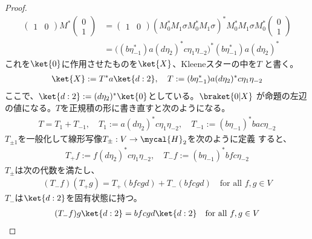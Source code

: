 {\begin{proof}
\begin{equation*}
\begin{split}
\begin{pmatrix}
				1 & 0
			\end{pmatrix}M^*\begin{pmatrix}
				0 \\ 1
			\end{pmatrix} &= \begin{pmatrix}
				1 & 0
			\end{pmatrix}(M_0^*M_1\sigma M_0^*M_1\sigma)^*M_0^*M_1\sigma M_0^*
			\begin{pmatrix}
				0 \\ 1
			\end{pmatrix} \\
			&= \bigl((b\eta_{-1}^*)a(d\eta_2)^*c\eta_1\eta_{-2}\bigr)^*
			(b\eta_{-1}^*)a(d\eta_2)^*
		\end{split}\end{equation*}
		これを$\ket{0}$に作用させたものを$\ket{X}$、Kleeneスターの中を$T$
		と書く。
		\begin{equation*}\begin{split}
			\ket{X} := T^*a\ket{d:2},\quad
			T := (b\eta_{-1}^*)a(d\eta_2)^*c\eta_1\eta_{-2}
		\end{split}\end{equation*}
		ここで、$\ket{d:2}:=(d\eta_2)^*\ket{0}$としている。$\braket{0|X}$
		が命題の左辺の値になる。$T$を正規積の形に書き直すと次のようになる。
		\begin{equation*}\begin{split}
			T = T_1 + T_{-1},\quad
			T_1 := a(d\eta_2)^*c\eta_1\eta_{-2},\quad
			T_{-1} := (b\eta_{-1})^*bac\eta_{-2}
		\end{split}\end{equation*}
		$T_{\pm1}$を一般化して線形写像$T_\pm:V\to\mycal{H}_2$を次のように定義
		すると、
		\begin{equation*}\begin{split}
			T_+f := f(d\eta_2)^*c\eta_1\eta_{-2},\quad
			T_-f := (b\eta_{-1})^*bfc\eta_{-2}
		\end{split}\end{equation*}
		$T_\pm$は次の代数を満たし、
		\begin{equation*}\begin{split}
			(T_-f)(T_+g) = T_+(bfcgd) + T_-(bfcgd)
			\quad\text{for all } f,g\in V
		\end{split}\end{equation*}
		$T_-$は$\ket{d:2}$を固有状態に持つ。
		\begin{equation*}\begin{split}
			(T_-f)g\ket{d:2} = bfcgd\ket{d:2} \quad\text{for all } f,g\in V

\end{split}
\end{equation*}
\end{proof}}
